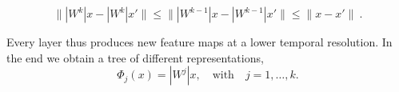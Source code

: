 $$\| |W^k| x - |W^k| x' \| \leq \| |W^{k-1}| x - |W^{k-1}| x' \| \leq \| x - x' \| ~.$$

Every layer thus produces new feature maps at a lower temporal resolution. 
In the end we obtain a tree of different representations,
$$\Phi_j(x) = |W^j| x, \quad \textrm{with} \quad j=1,\ldots, k.$$ 


%
%
%
%
%
%
%

%
%
%
%
%
%
